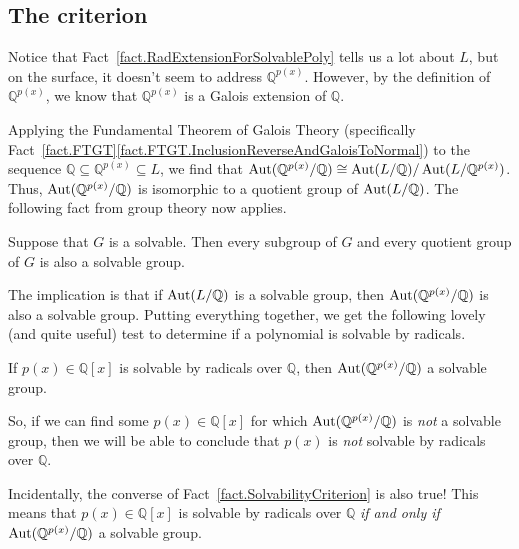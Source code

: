 \subsection{The criterion}

Notice that Fact~\ref{fact.RadExtensionForSolvablePoly} tells us a lot about $L$, but on the surface, it doesn't seem to address $\mathbb{Q}^{p(x)}$. However, by the definition of $\mathbb{Q}^{p(x)}$, we know that $\mathbb{Q}^{p(x)}$ is a Galois extension of $\mathbb{Q}$. 

Applying the Fundamental Theorem of Galois Theory (specifically Fact~\ref{fact.FTGT}\ref{fact.FTGT.InclusionReverseAndGaloisToNormal}) to the sequence $\mathbb{Q} \subseteq \mathbb{Q}^{p(x)} \subseteq L$, we find that $\operatorname{Aut}(\mathbb{Q}^{p(x)}/\mathbb{Q})\cong \operatorname{Aut}(L/\mathbb{Q})/ \operatorname{Aut}(L/\mathbb{Q}^{p(x)})$. Thus, $\operatorname{Aut}(\mathbb{Q}^{p(x)}/\mathbb{Q})$ is isomorphic to a quotient group of $\operatorname{Aut}(L/\mathbb{Q})$. The following fact from group theory now applies. 

\begin{fact}
Suppose that $G$ is a solvable. Then every subgroup of $G$ and every quotient group of $G$ is also a solvable group.
\end{fact}

The implication is that if $\operatorname{Aut}(L/\mathbb{Q})$ is a solvable group, then $\operatorname{Aut}(\mathbb{Q}^{p(x)}/\mathbb{Q})$ is also a solvable group. Putting everything together, we get the following lovely (and quite useful) test to determine if a polynomial is solvable by radicals. 

\begin{fact}\label{fact.SolvabilityCriterion}
If $p(x)\in \mathbb{Q}[x]$ is solvable by radicals over $\mathbb{Q}$, then $\operatorname{Aut}(\mathbb{Q}^{p(x)}/\mathbb{Q})$ a solvable group.
\end{fact}

So, if we can find some $p(x)\in \mathbb{Q}[x]$ for which $\operatorname{Aut}(\mathbb{Q}^{p(x)}/\mathbb{Q})$ is \emph{not} a solvable group, then we will be able to conclude that 
$p(x)$ is \emph{not} solvable by radicals over $\mathbb{Q}$.

Incidentally, the converse of Fact~\ref{fact.SolvabilityCriterion} is also true! This means that $p(x)\in \mathbb{Q}[x]$ is solvable by radicals over $\mathbb{Q}$ \emph{if and only if} $\operatorname{Aut}(\mathbb{Q}^{p(x)}/\mathbb{Q})$ a solvable group.












